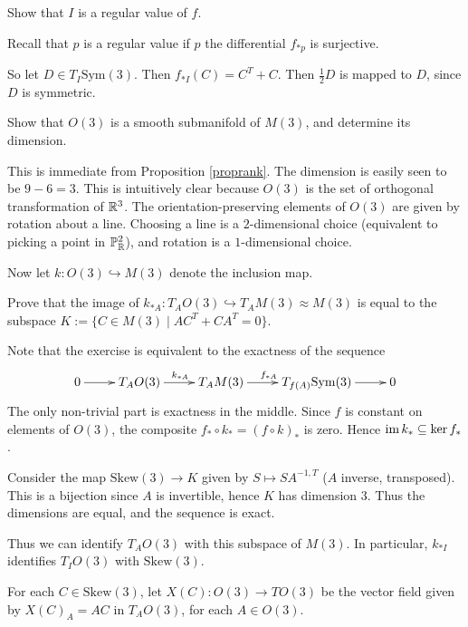 \documentclass[11pt, english]{article}
\begin{document}
\begin{exc}
Show that $I$ is a regular value of $f$.
\end{exc}
\begin{sol}
Recall that $p$ is a regular value if $p$ the differential $f_{\ast p}$ is surjective.

So let $D \in T_{I}\mathrm{Sym}(3)$. Then $f_{\ast I}(C) = C^T+ C$. Then $\frac 12 D$ is mapped to $D$, since $D$ is symmetric.
\end{sol}

\begin{exc}
 Show that $O(3)$ is a smooth submanifold of $M(3)$, and determine its dimension.
\end{exc}
\begin{sol}
This is immediate from Proposition \ref{proprank}. The dimension is easily seen to be $9-6=3$. This is intuitively clear because $O(3)$ is the set of orthogonal transformation of $\mathbb{R}^3$. The orientation-preserving elements of $O(3)$ are given by rotation about a line. Choosing a line is a $2$-dimensional choice (equivalent to picking a point in $\mathbb{P}_{\mathbb{R}}^2$), and rotation is a $1$-dimensional choice. 
\end{sol}

Now let $k:O(3) \hookrightarrow M(3)$ denote the inclusion map. 
\begin{exc}
  Prove that the image of $k_{\ast A}:T_AO(3) \hookrightarrow T_AM(3) \approx M(3)$ is equal to the subspace $K:= \{ C \in M(3) \mid AC^T + CA^T=0 \}$. 
\end{exc}
\begin{sol}
Note that the exercise is equivalent to the exactness of the sequence
\[
\xymatrix{
0 \ar[r] & T_AO(3) \ar[r]^{k_{\ast A}} & T_AM(3) \ar[r]^{f_{\ast A}} & T_{f(A)}\mathrm{Sym}(3) \ar[r] & 0 
}
\]
The only non-trivial part is exactness in the middle. Since $f$ is constant on elements of $O(3)$, the composite $f_\ast \circ k_\ast = (f \circ k)_\ast$ is zero. Hence $\operatorname{im} k_\ast \subseteq \ker f_\ast$.

Consider the map $\mathrm{Skew}(3) \to K$ given by $S \mapsto SA^{-1,T}$ ($A$ inverse, transposed). This is a bijection since $A$ is invertible, hence $K$ has dimension $3$. Thus the dimensions are equal, and the sequence is exact.
\end{sol}

Thus we can identify $T_AO(3)$ with this subspace of $M(3)$. In particular, $k_{\ast I}$ identifies $T_IO(3)$ with $\mathrm{Skew}(3)$. 

For each $C \in \mathrm{Skew}(3)$, let $X(C):O(3) \to TO(3)$ be the vector field given by $X(C)_A=AC$ in $T_AO(3)$, for each $A \in O(3)$.
\end{document}
